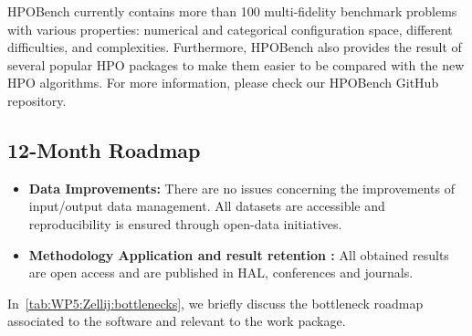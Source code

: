\begin{itemize}
HPOBench currently contains more than 100 multi-fidelity benchmark problems with various properties: numerical and categorical configuration space, different difficulties, and complexities. Furthermore, HPOBench also provides the result of several popular HPO packages to make them easier to be compared with the new HPO algorithms. For more information, please check our HPOBench GitHub repository.




\end{itemize}

\subsection{12-Month Roadmap}
\label{sec:WP5:Zellij:roadmap}

\begin{itemize}

\item \textbf{Data Improvements:} There are no issues concerning the improvements of input/output data management. All datasets are accessible and reproducibility is ensured through open-data initiatives.

\item \textbf{Methodology Application and result retention :} All obtained results are open access and are published in HAL, conferences and journals.
\end{itemize}

In~\cref{tab:WP5:Zellij:bottlenecks}, we briefly discuss the bottleneck roadmap associated to the software and relevant to the work package.

